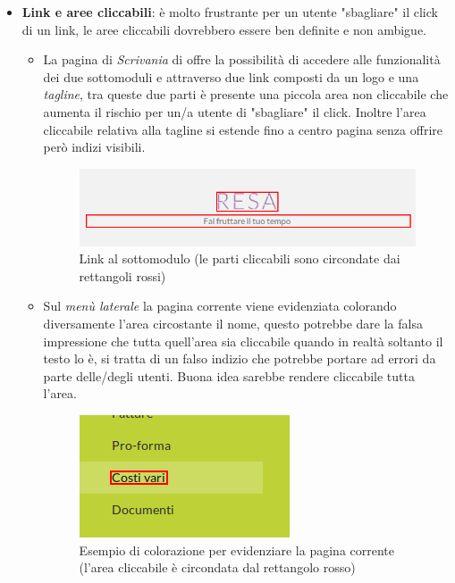 \begin{itemize}
\item \textbf{Link e aree cliccabili}: è molto frustrante per un utente "sbagliare"
il click di un link, le aree cliccabili dovrebbero essere ben definite e non ambigue.
	\begin{itemize}
	\item La pagina di \textit{Scrivania} di \fiscoloWeb{} offre la possibilità di accedere
	alle funzionalità dei due sottomoduli \fiscolo{} e \resa{} attraverso due link
	composti da un logo e una \textit{tagline}, tra queste due parti è presente una piccola
	area non cliccabile che aumenta il rischio per un/a utente di "sbagliare" il click.
	Inoltre l'area cliccabile relativa alla tagline si estende fino a centro pagina senza
	offrire però indizi visibili.
	
	\begin{figure}[H]\label{imgDashboardLink}
		\centering
		\includegraphics[width=.8\columnwidth]{images/dashboardLink.png}
		\caption{Link al sottomodulo \resa{} (le parti cliccabili sono circondate dai rettangoli rossi)}
	\end{figure}
	
	\item Sul \textit{menù laterale} la pagina corrente viene evidenziata colorando diversamente
	l'area circostante il nome, questo potrebbe dare la falsa impressione che tutta quell'area
	sia cliccabile quando in realtà soltanto il testo lo è, si tratta di un falso indizio che
	potrebbe portare ad errori da parte delle/degli utenti. Buona idea sarebbe rendere cliccabile
	tutta l'area.
	
	\begin{figure}[H]\label{imgLeftNav}
	\centering
	\includegraphics[width=.4\columnwidth]{images/areacliccabile.png}
	\caption{Esempio di colorazione per evidenziare la pagina corrente (l'area cliccabile è circondata dal rettangolo rosso)}
	\end{figure}
		

\end{itemize}
\end{itemize}
